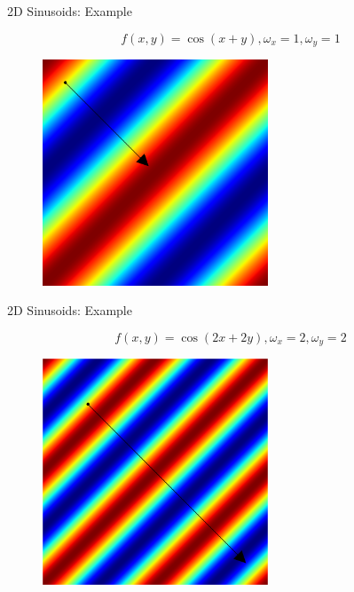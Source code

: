 \documentclass{beamer}
\begin{document}
\begin{frame}{2D Sinusoids: Example}

\[ f(x, y) = \cos( x + y ), \omega_x = 1, \omega_y = 1 \]

\begin{figure}[t]
    \includegraphics[width=0.6\textwidth]{2DPlaneWaves/1_1.png}
\end{figure}

\end{frame}



\begin{frame}{2D Sinusoids: Example}

\[ f(x, y) = \cos( 2x + 2y ), \omega_x = 2, \omega_y = 2 \]

\begin{figure}[t]
    \includegraphics[width=0.6\textwidth]{2DPlaneWaves/2_2.png}
\end{figure}

\end{frame}
\end{document}
